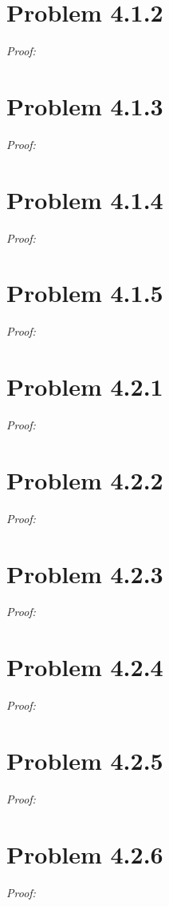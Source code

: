 \documentclass[11pt]{article}
\theoremstyle{definition}
\theoremstyle{remark}
\theoremstyle{problem}
\begin{document}
\section{Problem 4.1.2}
\textit{Proof:} 
\newpage

\section{Problem 4.1.3}
\textit{Proof:} 
\newpage

\section{Problem 4.1.4}
\textit{Proof:} 
\newpage

\section{Problem 4.1.5}
\textit{Proof:} 
\newpage

\section{Problem 4.2.1}
\textit{Proof:} 
\newpage

\section{Problem 4.2.2}
\textit{Proof:} 
\newpage

\section{Problem 4.2.3}
\textit{Proof:} 
\newpage

\section{Problem 4.2.4}
\textit{Proof:} 
\newpage

\section{Problem 4.2.5}
\textit{Proof:} 
\newpage

\section{Problem 4.2.6}
\textit{Proof:} 
\newpage
\end{document}
